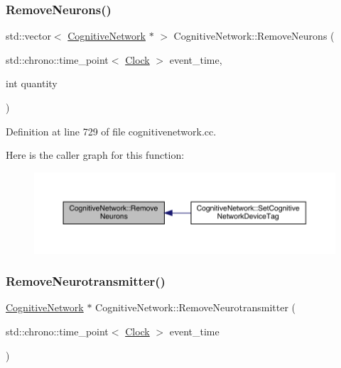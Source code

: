 \subsubsection{\texorpdfstring{Remove\+Neurons()}{RemoveNeurons()}}
{\footnotesize\ttfamily std\+::vector$<$ \hyperlink{class_cognitive_network}{Cognitive\+Network} $\ast$ $>$ Cognitive\+Network\+::\+Remove\+Neurons (\begin{DoxyParamCaption}\item[{std\+::chrono\+::time\+\_\+point$<$ \hyperlink{universe_8h_a0ef8d951d1ca5ab3cfaf7ab4c7a6fd80}{Clock} $>$}]{event\+\_\+time,  }\item[{int}]{quantity }\end{DoxyParamCaption})}



Definition at line 729 of file cognitivenetwork.\+cc.

Here is the caller graph for this function\+:
\nopagebreak
\begin{figure}[H]
\begin{center}
\leavevmode
\includegraphics[width=350pt]{class_cognitive_network_a130985ff0aa14b2a17fc2c589e65f868_icgraph}
\end{center}
\end{figure}
\mbox{\label{class_cognitive_network_ac0728c12a6d4bb87b6e8c9163435c8e6}} 
\subsubsection{\texorpdfstring{Remove\+Neurotransmitter()}{RemoveNeurotransmitter()}}
{\footnotesize\ttfamily \hyperlink{class_cognitive_network}{Cognitive\+Network} $\ast$ Cognitive\+Network\+::\+Remove\+Neurotransmitter (\begin{DoxyParamCaption}\item[{std\+::chrono\+::time\+\_\+point$<$ \hyperlink{universe_8h_a0ef8d951d1ca5ab3cfaf7ab4c7a6fd80}{Clock} $>$}]{event\+\_\+time }\end{DoxyParamCaption})}




